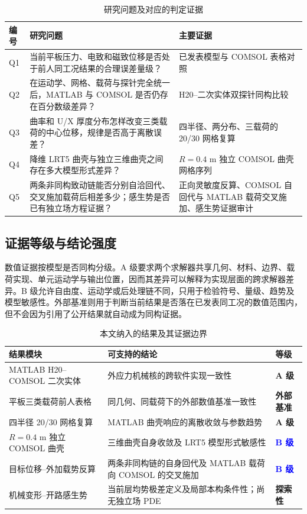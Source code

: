 \documentclass[UTF8,fontset=windows,11pt,a4paper]{ctexart}
\newcommand{\tierA}{\textcolor{ok}{\textbf{A 级}}}
\newcommand{\tierB}{\textcolor{blue}{\textbf{B 级}}}
\begin{document}
\begin{table}[H]
\centering
\caption{研究问题及对应的判定证据}
\label{tab:research_questions}
\scriptsize
\begin{tabularx}{\textwidth}{p{}Xp{}}
\toprule
编号 & 研究问题 & 主要证据 \\
\midrule
Q1 & 当前平板压力、电致和磁致位移是否处于前人同工况结果的合理误差量级？ & 已发表模型与 COMSOL 表格对照 \\
Q2 & 在运动学、网格、载荷与探针完全统一后，MATLAB 与 COMSOL 是否仍存在百分数级差异？ & H20--二次实体双探针同构比较 \\
Q3 & 曲率和 U/X 厚度分布怎样改变三类载荷的中心位移，规律是否高于离散误差？ & 四半径、两分布、三载荷的 20/30 网格复算 \\
Q4 & 降维 LRT5 曲壳与独立三维曲壳之间存在多大模型形式差异？ & $R=0.4$ m 独立 COMSOL 曲壳网格序列 \\
Q5 & 两条非同构致动链能否分别自洽回代、交叉施加载荷后相差多少；感生势是否已有独立场方程证据？ & 正向灵敏度反算、COMSOL 自回代与 MATLAB 载荷交叉施加、感生势证据审计 \\
\bottomrule
\end{tabularx}
\end{table}

\subsection{证据等级与结论强度}

数值证据按模型是否同构分级。A 级要求两个求解器共享几何、材料、边界、载荷实现、单元运动学与输出位置，因而其差异可以解释为实现层面的跨求解器差异。B 级允许自由度、运动学或后处理链不同，只用于检验符号、量级、趋势及模型敏感性。外部基准则用于判断当前结果是否落在已发表同工况的数值范围内，但不会因为引用了公开结果就自动成为同构证据。

\begin{table}[H]
\centering
\caption{本文纳入的结果及其证据边界}
\small
\begin{tabularx}{\textwidth}{p{}Xp{}}
\toprule
结果模块 & 可支持的结论 & 等级 \\
\midrule
MATLAB H20--COMSOL 二次实体 & 外应力机械核的跨软件实现一致性 & \tierA \\
平板三类载荷前人表格 & 同几何、同载荷下的外部数值基准一致性 & \textbf{外部基准} \\
四半径 20/30 网格复算 & MATLAB 曲壳响应的离散收敛与参数趋势 & \tierA \\
$R=0.4$ m 独立 COMSOL 曲壳 & 三维曲壳自身收敛及 LRT5 模型形式敏感性 & \tierB \\
目标位移--外加载势反算 & 两条非同构链的自身回代及 MATLAB 载荷向 COMSOL 的交叉施加 & \tierB \\
机械变形--开路感生势 & 当前层均势极差定义及局部本构条件性；尚无独立场 PDE & \textbf{探索性} \\
\bottomrule
\end{tabularx}
\end{table}
\end{document}
